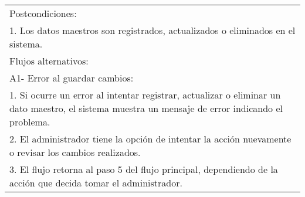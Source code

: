 \documentclass[stu, 12pt, letterpaper, donotrepeattitle, floatsintext, natbib]{apa7}
\begin{document}
\begin{longtable}{@{} p{16.5cm} @{}}
    Postcondiciones:                                                                                                                                                                              \\
    1. Los datos maestros son registrados, actualizados o eliminados en el sistema.                                                                                                               \\ \midrule
    Flujos alternativos:                                                                                                                                                                          \\
    A1- Error al guardar cambios:                                                                                                                                                                 \\
    \hspace{1cm}1. Si ocurre un error al intentar registrar, actualizar o eliminar un dato maestro, el sistema muestra un mensaje de error indicando el problema.                                 \\
    \hspace{1cm}2. El administrador tiene la opci\'on de intentar la acci\'on nuevamente o revisar los cambios realizados.                                                                        \\
    \hspace{1cm}3. El flujo retorna al paso 5 del flujo principal, dependiendo de la acci\'on que decida tomar el administrador.                                                                  \\ \bottomrule
\end{longtable}
\newpage
\end{document}
